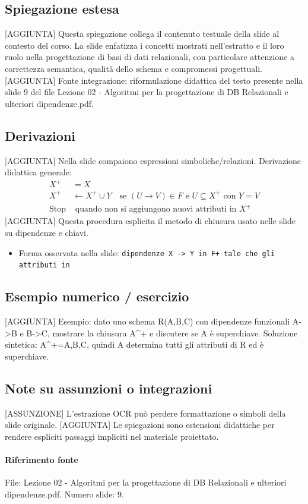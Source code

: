 \documentclass[11pt]{article}
\begin{document}
\subsection*{Spiegazione estesa}
[AGGIUNTA] Questa spiegazione collega il contenuto testuale della slide al contesto del corso. La slide enfatizza i concetti mostrati nell'estratto e il loro ruolo nella progettazione di basi di dati relazionali, con particolare attenzione a correttezza semantica, qualità dello schema e compromessi progettuali.
[AGGIUNTA] Fonte integrazione: riformulazione didattica del testo presente nella slide 9 del file Lezione 02 - Algoritmi per la progettazione di DB Relazionali e ulteriori dipendenze.pdf.
\subsection*{Derivazioni}
[AGGIUNTA] Nella slide compaiono espressioni simboliche/relazioni. Derivazione didattica generale:
\begin{align*}
X^+ &= X \\
X^+ &\leftarrow X^+ \cup Y \quad \text{se } (U \to V) \in F \text{ e } U \subseteq X^+ \text{ con } Y=V \\
\text{Stop} &\text{ quando non si aggiungono nuovi attributi in } X^+
\end{align*}
[AGGIUNTA] Questa procedura esplicita il metodo di chiusura usato nelle slide su dipendenze e chiavi.
\begin{itemize}[leftmargin=*]
\item Forma osservata nella slide: \texttt{dipendenze X -> Y in F+ tale che gli attributi in}
\end{itemize}
\subsection*{Esempio numerico / esercizio}
[AGGIUNTA] Esempio: dato uno schema R(A,B,C) con dipendenze funzionali A->B e B->C, mostrare la chiusura A^+ e discutere se A è superchiave. Soluzione sintetica: A^+={A,B,C}, quindi A determina tutti gli attributi di R ed è superchiave.
\subsection*{Note su assunzioni o integrazioni}
[ASSUNZIONE] L'estrazione OCR può perdere formattazione o simboli della slide originale.
[AGGIUNTA] Le spiegazioni sono estensioni didattiche per rendere espliciti passaggi impliciti nel materiale proiettato.
\paragraph{Riferimento fonte} File: Lezione 02 - Algoritmi per la progettazione di DB Relazionali e ulteriori dipendenze.pdf. Numero slide: 9.
\end{document}
